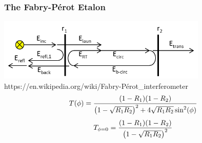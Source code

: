 \documentclass{beamer}
\begin{document}
        \begin{frame}
            \frametitle{The Fabry-P\'erot Etalon}
            \centering
            \includegraphics[width=0.75\textwidth]{images/etalon_schematic.png}\\
            \tiny https://en.wikipedia.org/wiki/Fabry-P\'erot\_interferometer\\
            \small
            \vspace{0.5cm}
            $$T(\phi)=\frac{\qty(1-R_1)\qty(1-R_2)}{\qty(1-\sqrt{R_1R_2})^2+4\sqrt{R_1R_2}\sin^2(\phi)}$$
            \vspace{0.5cm}
            $$T_{\phi=0}=\frac{\qty(1-R_1)\qty(1-R_2)}{\qty(1-\sqrt{R_1R_2})^2}$$
        \end{frame}
        
\end{document}
